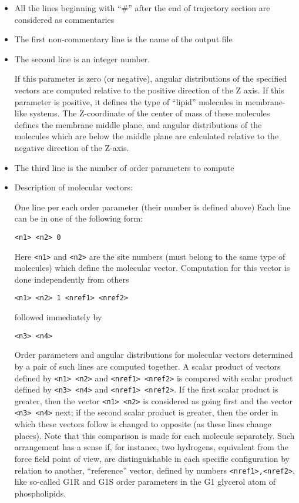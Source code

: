 \documentclass{article}
\begin{document}
\begin{itemize}

\item
All the lines beginning with ``\#'' after the end of trajectory section
are considered as commentaries

\item
The first non-commentary line is the name of the output file

\item
The second line is an integer number.

If this parameter is zero (or negative), angular
distributions of the specified vectors are computed relative to the
positive direction of the Z axis. If this parameter is positive,
it defines the type of ``lipid'' molecules in membrane-like systems. 
The Z-coordinate of the center of mass of these molecules defines the 
membrane middle plane, and angular distributions of the molecules which 
are below the middle plane are calculated relative to the negative direction 
of the Z-axis. 

\item
The third line is the number of order parameters to compute

\item
Description of molecular vectors:

One line per each order parameter (their number is defined above)
Each line can be in one of the following form:

\verb|<n1> <n2> 0|

Here \verb|<n1>| and \verb|<n2>| are the site numbers (must belong to the 
same type of molecules) which define the molecular vector. Computation for
this vector is done independently from others

\verb|<n1> <n2> 1 <nref1> <nref2>|

followed immediately by 

\verb|<n3> <n4> |

Order parameters and angular distributions for molecular vectors 
determined by a pair of such lines
are computed together. A scalar product of vectors defined by
\verb|<n1> <n2>| and \verb|<nref1> <nref2>| is compared with scalar
product defined by \verb|<n3> <n4>| and \verb|<nref1> <nref2>|. If the
first scalar product is greater, then the vector \verb|<n1> <n2>| is
considered as going first and the vector \verb|<n3> <n4>| next; if
the second scalar product is greater, then the order in which these vectors
follow is changed to opposite (as these lines change places). Note that 
this comparison is made for each molecule separately. Such arrangement has a
sense if, for instance, two hydrogens, equivalent from the force field point
of view, are distinguishable in each specific configuration by relation to
another, ``reference'' vector, defined by numbers \verb|<nref1>,<nref2>|,
like so-called G1R and G1S order parameters in the G1 glycerol atom of
phospholipids.


\end{itemize}
\end{document}
